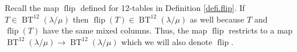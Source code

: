 \documentclass[numbers=enddot,12pt,final,onecolumn,notitlepage]{scrartcl}%
\theoremstyle{definition}
\def\lm{{\lambda/\mu}}
\def\BenignTables{{\operatorname{BT}^{12}\left(  \lambda/\mu\right)}}
\def\flip{{\operatorname{flip}}}
\begin{document}
Recall the map $\flip$ defined for 12-tables in Definition \ref{defi.flip}. If $T\in\BenignTables$ then $\flip(T)\in\BenignTables$ as well because $T$ and $\flip(T)$ have the same mixed columns. Thus, the map $\flip$ restricts to a map $\BenignTables\to\BenignTables$ which we will also denote $\flip$. 

\begin{comment}
 

\subsection{The $\operatorname*{flip}$ map on benign 12-tables}

We define a map $\operatorname*{flip}:\BenignTables\rightarrow\BenignTables$ as
follows: Let $T\in\BenignTables$. For
every nonempty column of $T$, we
transform the column as follows:

\begin{itemize}
\item \textbf{If} this column is 1-pure, we replace all its entries by $2$'s
(so that it becomes 2-pure).

\item \textbf{Otherwise}, if this column is 2-pure, we replace all its entries by
$1$'s (so that it becomes 1-pure).

\item \textbf{Otherwise} (i.e., if this column is mixed), we do not change it.
\end{itemize}

Once these transformations are made, the resulting filling of $\lm$
is a 12-table which is still benign (in fact, it has the same mixed
columns as $T$). We define $\operatorname*{flip}\left(
T\right)  $ to be this resulting 12-table. Thus, the map
$\operatorname*{flip}:\BenignTables\rightarrow\BenignTables$ is defined.


\end{comment}
\end{document}
